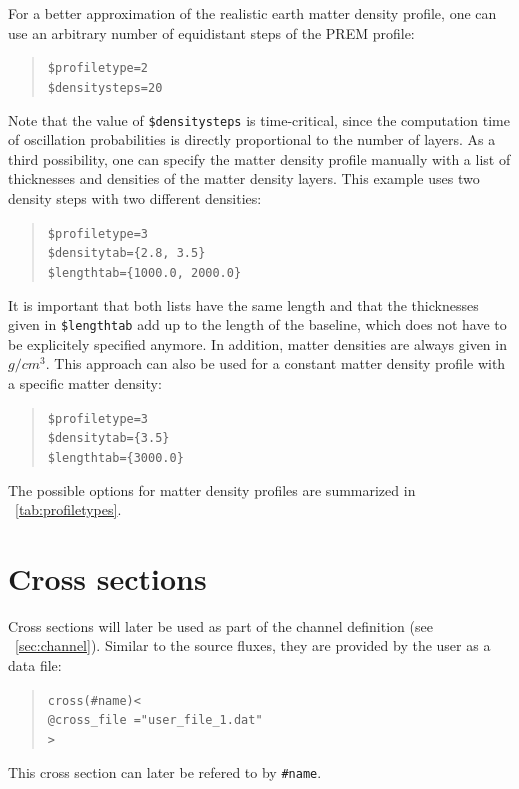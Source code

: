 For a better approximation of the realistic earth matter density profile, one can use an arbitrary number of equidistant steps of the PREM profile:
\begin{quote}
{\tt \$profiletype=2 } \\
{\tt \$densitysteps=20 }
\end{quote}
Note that the value of {\tt \$densitysteps} is time-critical, since the
computation time of oscillation probabilities is directly 
proportional to the number of layers.
%
As a  third possibility, one can specify the matter density profile 
manually with a list of thicknesses and densities of the matter density layers. This example uses two density steps with two different densities:
\begin{quote}
{\tt \$profiletype=3 } \\
{\tt \$densitytab=\{2.8, 3.5\}}\\
{\tt \$lengthtab=\{1000.0, 2000.0\}}
\end{quote}
It is important that both lists have the same length and that the  thicknesses given in  {\tt \$lengthtab} add up to the length of
the baseline, which does not have to be explicitely specified anymore. In addition, matter densities are always given in $g/cm^3$.
%
This approach can also be used for a constant matter density profile with
a specific matter density:
\begin{quote}
{\tt \$profiletype=3 } \\
{\tt \$densitytab=\{3.5\}}\\
{\tt \$lengthtab=\{3000.0\}}
\end{quote}
The possible options for matter density profiles are summarized in \Tab~\ref{tab:profiletypes}.


\section{Cross sections}
\label{sec:cross_section}

Cross sections will later be used as part of the 
channel definition (see \Sec~\ref{sec:channel}). Similar to the source 
fluxes, they are provided by the user as a data file:
\begin{quote}
{\tt cross(\#name)<}\\
{\tt \tb @cross\_file ="user\_file\_1.dat"}\\
{\tt >}
\end{quote}  
This cross section can later be refered to by {\tt \#name}.

